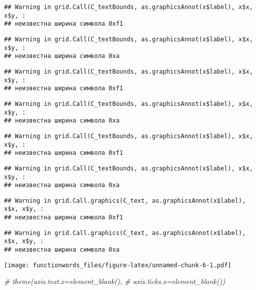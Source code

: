 \documentclass[
]{article}
\newenvironment{Shaded}{\begin{snugshade}}{\end{snugshade}}
\newcommand{\CommentTok}[1]{\textcolor[rgb]{0.56,0.35,0.01}{\textit{#1}}}
\begin{document}
\begin{verbatim}
## Warning in grid.Call(C_textBounds, as.graphicsAnnot(x$label), x$x, x$y, :
## неизвестна ширина символа 0xf1
\end{verbatim}

\begin{verbatim}
## Warning in grid.Call(C_textBounds, as.graphicsAnnot(x$label), x$x, x$y, :
## неизвестна ширина символа 0xa
\end{verbatim}

\begin{verbatim}
## Warning in grid.Call(C_textBounds, as.graphicsAnnot(x$label), x$x, x$y, :
## неизвестна ширина символа 0xf1
\end{verbatim}

\begin{verbatim}
## Warning in grid.Call(C_textBounds, as.graphicsAnnot(x$label), x$x, x$y, :
## неизвестна ширина символа 0xa
\end{verbatim}

\begin{verbatim}
## Warning in grid.Call(C_textBounds, as.graphicsAnnot(x$label), x$x, x$y, :
## неизвестна ширина символа 0xf1
\end{verbatim}

\begin{verbatim}
## Warning in grid.Call(C_textBounds, as.graphicsAnnot(x$label), x$x, x$y, :
## неизвестна ширина символа 0xa
\end{verbatim}

\begin{verbatim}
## Warning in grid.Call.graphics(C_text, as.graphicsAnnot(x$label), x$x, x$y, :
## неизвестна ширина символа 0xf1
\end{verbatim}

\begin{verbatim}
## Warning in grid.Call.graphics(C_text, as.graphicsAnnot(x$label), x$x, x$y, :
## неизвестна ширина символа 0xa
\end{verbatim}

\texttt{[image: functionwords\_files/figure-latex/unnamed-chunk-6-1.pdf]}

\begin{Shaded}
\begin{Highlighting}[]
 \CommentTok{# theme(axis.text.x=element_blank(),}
       \CommentTok{# axis.ticks.x=element_blank())}
\end{Highlighting}
\end{Shaded}
\end{document}
